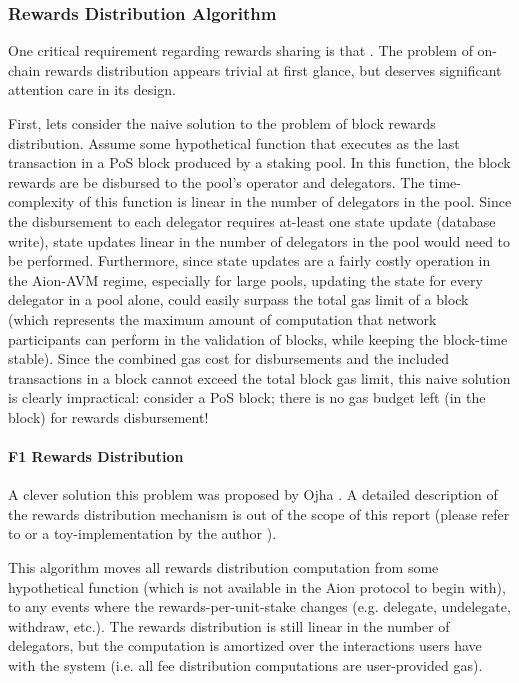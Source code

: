 \subsubsection{Rewards Distribution Algorithm} \label{f1-rewards}

One critical requirement regarding rewards sharing is that . The problem of on-chain rewards distribution appears trivial at first glance, but deserves significant attention care in its design.  

First, lets consider the naive solution to the problem of block rewards distribution. Assume some hypothetical  function that executes as the last transaction in a PoS block produced by a staking pool. In this function, the block rewards are be disbursed to the pool's operator and delegators. The time-complexity of this function is linear in the number of delegators in the pool. Since the disbursement to each delegator requires at-least one state update (database write), state updates linear in the number of delegators in the pool would need to be performed. Furthermore, since state updates are a fairly costly operation in the Aion-AVM regime, especially for large pools, updating the state for every delegator in a pool alone, could easily surpass the total gas limit of a block (which represents the maximum amount of computation that network participants can perform in the validation of blocks, while keeping the block-time stable). Since the combined gas cost for disbursements and the included transactions in a block cannot exceed the total block gas limit, this naive solution is clearly impractical: consider a  PoS block; there is no gas budget left (in the block) for rewards disbursement!  

\paragraph{F1 Rewards Distribution} A clever solution this problem was proposed by Ojha \cite{Ojh19}. A detailed description of the rewards distribution mechanism is out of the scope of this report (please refer to \cite{Ojh19} or a toy-implementation by the author \cite{Sha19}). 

This algorithm moves all rewards distribution computation from some hypothetical  function (which is not available in the Aion protocol to begin with), to any events where the rewards-per-unit-stake changes (e.g. delegate, undelegate, withdraw, etc.). The rewards distribution is still linear in the number of delegators, but the computation is amortized over the interactions users have with the system (i.e. all fee distribution computations are  user-provided gas).   

